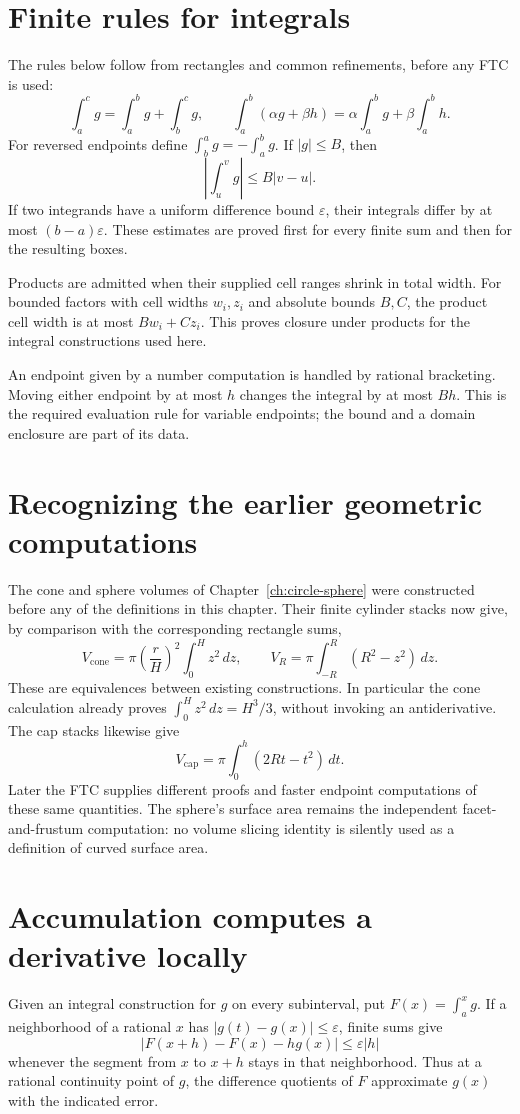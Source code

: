 \section{Finite rules for integrals}
The rules below follow from rectangles and common refinements, before any
FTC is used:
\[
 \int_a^c g=\int_a^b g+\int_b^c g,\qquad
 \int_a^b(\alpha g+\beta h)=\alpha\int_a^b g+\beta\int_a^b h.
\]
For reversed endpoints define $\int_b^a g=-\int_a^b g$.
If $|g|\le B$, then
\[
 \left|\int_u^v g\right|\le B|v-u|.
\]
If two integrands have a uniform difference bound $\varepsilon$, their
integrals differ by at most $(b-a)\varepsilon$.  These estimates are
proved first for every finite sum and then for the resulting boxes.

Products are admitted when their supplied cell ranges shrink in total
width.  For bounded factors with cell widths $w_i,z_i$ and absolute bounds
$B,C$, the product cell width is at most $Bw_i+Cz_i$.  This proves closure
under products for the integral constructions used here.

An endpoint given by a number computation is handled by rational
bracketing.  Moving either endpoint by at most $h$ changes the integral
by at most $Bh$.  This is the required evaluation rule for variable
endpoints; the bound and a domain enclosure are part of its data.

\section{Recognizing the earlier geometric computations}
\label{sec:geometry-as-integrals}
The cone and sphere volumes of Chapter~\ref{ch:circle-sphere} were
constructed before any of the definitions in this chapter.  Their finite
cylinder stacks now give, by comparison with the corresponding rectangle
sums,
\[
 V_{\mathrm{cone}}=\pi\left(\frac rH\right)^2\int_0^H z^2\,dz,
 \qquad
 V_R=\pi\int_{-R}^{R}(R^2-z^2)\,dz.
\]
These are equivalences between existing constructions.  In particular the
cone calculation already proves $\int_0^H z^2\,dz=H^3/3$, without
invoking an antiderivative.  The cap stacks likewise give
\[
 V_{\mathrm{cap}}=\pi\int_0^h(2Rt-t^2)\,dt.
\]
Later the FTC supplies different proofs and faster endpoint computations
of these same quantities.  The sphere's surface area remains the
independent facet-and-frustum computation: no volume slicing identity is
silently used as a definition of curved surface area.

\section{Accumulation computes a derivative locally}
\label{sec:accumulation-derivative}
Given an integral construction for $g$ on every subinterval, put
$F(x)=\int_a^x g$.  If a neighborhood of a rational $x$ has
$|g(t)-g(x)|\le\varepsilon$, finite sums give
\[
 |F(x+h)-F(x)-h g(x)|\le\varepsilon |h|
\]
whenever the segment from $x$ to $x+h$ stays in that neighborhood.  Thus
at a rational continuity point of $g$, the difference quotients of $F$
approximate $g(x)$ with the indicated error.

